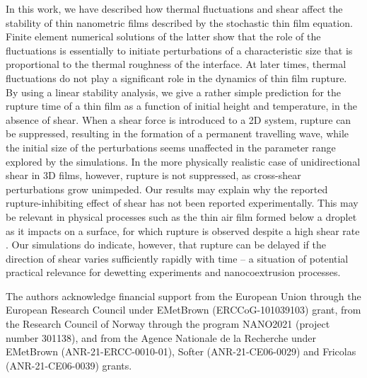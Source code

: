 \documentclass[
 onecolumn,
 amsmath,amssymb,
floatfix,superscriptaddress
]{revtex4-2}
\begin{document}
In this work, we have described how thermal fluctuations and shear affect the stability of thin nanometric films described by the stochastic thin film equation. Finite element numerical solutions of the latter show that the role of the fluctuations is essentially to initiate perturbations of a characteristic size that is proportional to the thermal roughness of the interface. At later times, thermal fluctuations do not play a significant role in the dynamics of thin film rupture. By using a linear stability analysis, we give a rather simple prediction for the rupture time of a thin film as a function of initial height and temperature, in the absence of shear. When a shear force is introduced to a 2D system, rupture can be suppressed, resulting in the formation of a permanent travelling wave, while the initial size of the perturbations seems unaffected in the parameter range explored by the simulations. In the more physically realistic case of unidirectional shear in 3D films, however, rupture is not suppressed, as cross-shear perturbations grow unimpeded. Our results may explain why the reported rupture-inhibiting effect of shear has not been reported experimentally. This may be relevant in physical processes such as the thin air film formed below a droplet as it impacts on a surface, for which rupture is observed despite a high shear rate \cite{KolinskiRubenstein2012}.  Our simulations do indicate, however, that rupture can be delayed if the direction of shear varies sufficiently rapidly with time -- a situation of potential practical relevance for dewetting experiments and nanocoextrusion processes.

\begin{acknowledgments}
The authors acknowledge financial support from the European Union through the European Research Council under EMetBrown (ERCCoG-101039103) grant, from the Research Council of Norway through the program NANO2021 (project number 301138), and from the Agence Nationale de la Recherche under EMetBrown (ANR-21-ERCC-0010-01), Softer (ANR-21-CE06-0029) and Fricolas (ANR-21-CE06-0039) grants.
\end{acknowledgments}
\FloatBarrier
\appendix
\end{document}
